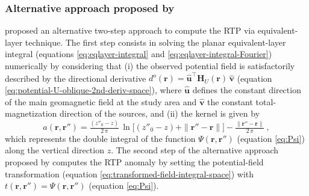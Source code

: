 \subsubsection{Alternative approach proposed by \citet{guspi_novara2009}}

\citet{guspi_novara2009} proposed an alternative two-step approach to compute the RTP via equivalent-layer technique. 
The first step consists in solving the planar 
equivalent-layer integral (equations \ref{eq:eqlayer-integral} and \ref{eq:eqlayer-integral-Fourier}) numerically 
by considering that (i) the observed potential field 
is satisfactorily described by the directional derivative 
$d^{o}(\mathbf{r}) = \hat{\mathbf{u}}^{\top} \mathbf{H}_{U}(\mathbf{r}) \, \hat{\mathbf{v}}$ 
(equation \ref{eq:potential-U-oblique-2nd-deriv-space}), where $\hat{\mathbf{u}}$ defines the constant direction of the main geomagnetic
field at the study area and $\hat{\mathbf{v}}$ the constant total-magnetization direction of the sources, and (ii)
the kernel is given by 
\begin{equation}
	a(\mathbf{r}, \mathbf{r}'') = \tfrac{\left( z''_{0} - z \right)}{2 \, \pi} \, 
	\ln{\Big[} \left( z''_{0} - z \right) + \| \mathbf{r}'' - \mathbf{r} \| {\Big]} - 
	\tfrac{\| \mathbf{r}'' - \mathbf{r} \|}{2 \, \pi} \: ,
	\label{eq:kernel-Fourier-Guspi}
\end{equation}
which represents the double integral of the function $\Psi(\mathbf{r}, \mathbf{r}'')$ (equation \ref{eq:Psi}) 
along the vertical direction $z$.
The second step of the alternative approach proposed by \citet{guspi_novara2009} computes the RTP anomaly 
by setting the potential-field transformation (equation \ref{eq:transformed-field-integral-space}) with 
$t(\mathbf{r}, \mathbf{r}'') = \Psi(\mathbf{r}, \mathbf{r}'')$ (equation \ref{eq:Psi}).

